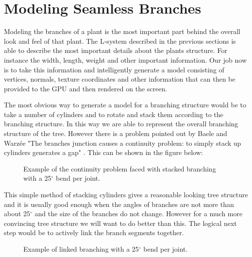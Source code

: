 \section{Modeling Seamless Branches}

\begin{flushleft}

Modeling the branches of a plant is the most important part behind the overall look and feel of that plant. The L-system described in the previous sections is able to describe the most important details about the plants structure. For instance the width, length, weight and other important information. Our job now is to take this information and intelligently generate a model consisting of vertices, normals, texture coordinates and other information that can then be provided to the GPU and then rendered on the screen.\\

\vspace{5mm}

The most obvious way to generate a model for a branching structure would be to take a number of cylinders and to rotate and stack them according to the branching structure. In this way we are able to represent the overall branching structure of the tree. However there is a problem pointed out by Baele and Warz\'{e}e "The branches junction causes a continuity problem: to simply stack up cylinders generates a gap" \cite{baele2005real}. This can be shown in the figure below:

\FloatBarrier

\begin{figure}[htbp]
	{\centering
		\vspace{7px}
		\setlength{\fboxrule}{1pt}
		\caption{Example of the continuity problem faced with stacked branching with a 25$^{\circ}$ bend per joint.}
	}
\end{figure}

\FloatBarrier

\vspace{5mm}


\vspace{5mm}

This simple method of stacking cylinders gives a reasonable looking tree structure and it is usually good enough when the angles of branches are not more than about 25$^{\circ}$ and the size of the branches do not change. However for a much more convincing tree structure we will want to do better than this. The logical next step would be to actively link the branch segments together.

\FloatBarrier

\begin{figure}[htbp]
	{\centering
		\vspace{7px}
		\setlength{\fboxrule}{1pt}
		\caption{Example of linked branching with a 25$^{\circ}$ bend per joint.}
	}
\end{figure}

\FloatBarrier

\end{flushleft}